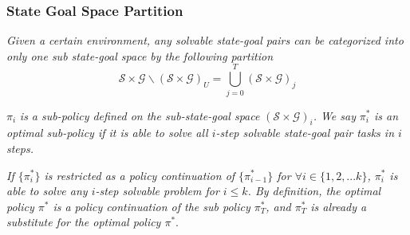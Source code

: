 \documentclass[10pt,hyperref={CJKbookmarks=true},envcountsect,mathserif]{beamer}
\begin{document}
\begin{frame}
	\frametitle{State Goal Space Partition}
\begin{definition}
	\textit{Given a certain environment, any solvable state-goal pairs can be categorized into only one sub state-goal space by the following partition}
	\vspace{-11pt}
	\begin{equation}
	\mathcal{S}\times\mathcal{G}\backslash(\mathcal{S}\times\mathcal{G})_{U} = \bigcup_{j=0}^T(\mathcal{S}\times\mathcal{G})_j
	\end{equation}
\end{definition}
\begin{definition}
	$\pi_i$ \textit{is a sub-policy defined on the sub-state-goal space} $(\mathcal{S}\times\mathcal{G})_i$\textit{. We say} $\pi_i^*$ \textit{is an optimal sub-policy if it is able to solve all $i$-step solvable state-goal pair tasks in $i$ steps.}
\end{definition}
	
	
	
\begin{corollary}%
	\label{cor1}
	\textit{If $\{\pi^*_i\}$ is restricted as a policy continuation of $\{\pi^*_{i-1}\}$ for $\forall i\in\{1,2,...k\}$, $\pi^*_i$ is able to solve any $i$-step solvable problem for $i\le k$. By definition, the optimal policy $\pi^*$ is a policy continuation of the sub policy $\pi^*_T$, and $\pi^*_T$ is already a substitute for the optimal policy $\pi^*$}.
\end{corollary}

\end{frame}
\end{document}
